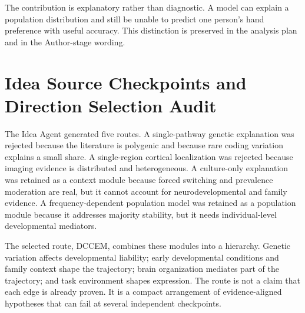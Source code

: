 \documentclass[10pt,conference]{IEEEtran}
\begin{document}
The contribution is explanatory rather than diagnostic. A model can explain a population distribution and still be unable to predict one person's hand preference with useful accuracy. This distinction is preserved in the analysis plan and in the Author-stage wording.

\section{Idea Source Checkpoints and Direction Selection Audit}
The Idea Agent generated five routes. A single-pathway genetic explanation was rejected because the literature is polygenic and because rare coding variation explains a small share. A single-region cortical localization was rejected because imaging evidence is distributed and heterogeneous. A culture-only explanation was retained as a context module because forced switching and prevalence moderation are real, but it cannot account for neurodevelopmental and family evidence. A frequency-dependent population model was retained as a population module because it addresses majority stability, but it needs individual-level developmental mediators.

The selected route, DCCEM, combines these modules into a hierarchy. Genetic variation affects developmental liability; early developmental conditions and family context shape the trajectory; brain organization mediates part of the trajectory; and task environment shapes expression. The route is not a claim that each edge is already proven. It is a compact arrangement of evidence-aligned hypotheses that can fail at several independent checkpoints.

\begin{table}[t]
\caption{Idea route audit.}
\centering
\small
{}
\end{table}
\end{document}
